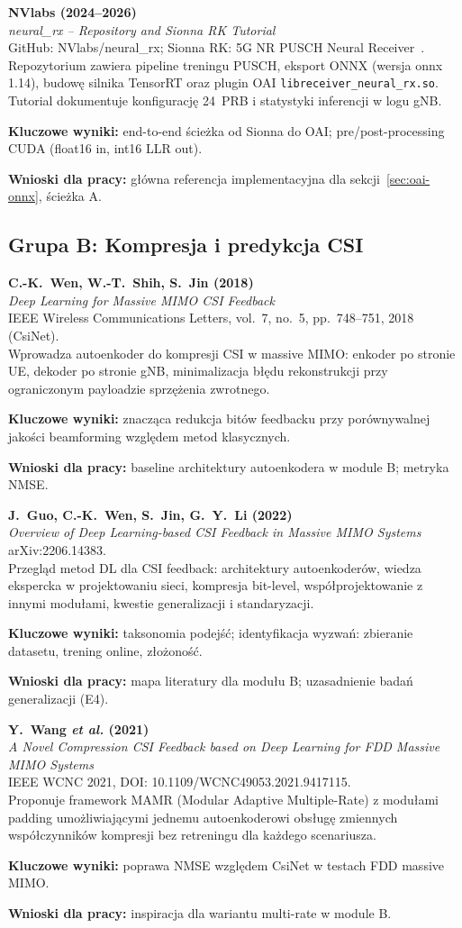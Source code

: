 \documentclass[12pt, a4paper]{article}
\newcommand{\bibentry}[4]{%
    \textbf{#1}\\
    \textit{#2}\\
    #3\\
    \vspace{0.3em}
    #4
    \vspace{0.8em}
}
\begin{document}
\bibentry{%
    NVlabs (2024--2026)}%
    {neural\_rx -- Repository and Sionna RK Tutorial}%
    {GitHub: NVlabs/neural\_rx; Sionna RK: 5G NR PUSCH Neural Receiver~\cite{sionna-rk}.}%
    {Repozytorium zawiera pipeline treningu PUSCH, eksport ONNX (wersja onnx 1.14), budowę silnika TensorRT oraz plugin OAI \texttt{libreceiver\_neural\_rx.so}. Tutorial dokumentuje konfigurację 24~PRB i statystyki inferencji w logu gNB.

    \textbf{Kluczowe wyniki:} end-to-end ścieżka od Sionna do OAI; pre/post-processing CUDA (float16 in, int16 LLR out).

    \textbf{Wnioski dla pracy:} główna referencja implementacyjna dla sekcji~\ref{sec:oai-onnx}, ścieżka A.}

\subsection{Grupa B: Kompresja i predykcja CSI}

\bibentry{%
    C.-K.~Wen, W.-T.~Shih, S.~Jin (2018)}%
    {Deep Learning for Massive MIMO CSI Feedback}%
    {IEEE Wireless Communications Letters, vol.~7, no.~5, pp.~748--751, 2018 (CsiNet).}%
    {Wprowadza autoenkoder do kompresji CSI w massive MIMO: enkoder po stronie UE, dekoder po stronie gNB, minimalizacja błędu rekonstrukcji przy ograniczonym payloadzie sprzężenia zwrotnego.

    \textbf{Kluczowe wyniki:} znacząca redukcja bitów feedbacku przy porównywalnej jakości beamforming względem metod klasycznych.

    \textbf{Wnioski dla pracy:} baseline architektury autoenkodera w module B; metryka NMSE.}

\bibentry{%
    J.~Guo, C.-K.~Wen, S.~Jin, G.~Y.~Li (2022)}%
    {Overview of Deep Learning-based CSI Feedback in Massive MIMO Systems}%
    {arXiv:2206.14383.}%
    {Przegląd metod DL dla CSI feedback: architektury autoenkoderów, wiedza ekspercka w projektowaniu sieci, kompresja bit-level, współprojektowanie z innymi modułami, kwestie generalizacji i standaryzacji.

    \textbf{Kluczowe wyniki:} taksonomia podejść; identyfikacja wyzwań: zbieranie datasetu, trening online, złożoność.

    \textbf{Wnioski dla pracy:} mapa literatury dla modułu B; uzasadnienie badań generalizacji (E4).}

\bibentry{%
    Y.~Wang \textit{et al.} (2021)}%
    {A Novel Compression CSI Feedback based on Deep Learning for FDD Massive MIMO Systems}%
    {IEEE WCNC 2021, DOI: 10.1109/WCNC49053.2021.9417115.}%
    {Proponuje framework MAMR (Modular Adaptive Multiple-Rate) z modułami padding umożliwiającymi jednemu autoenkoderowi obsługę zmiennych współczynników kompresji bez retreningu dla każdego scenariusza.

    \textbf{Kluczowe wyniki:} poprawa NMSE względem CsiNet w testach FDD massive MIMO.

    \textbf{Wnioski dla pracy:} inspiracja dla wariantu multi-rate w module B.}
\end{document}
